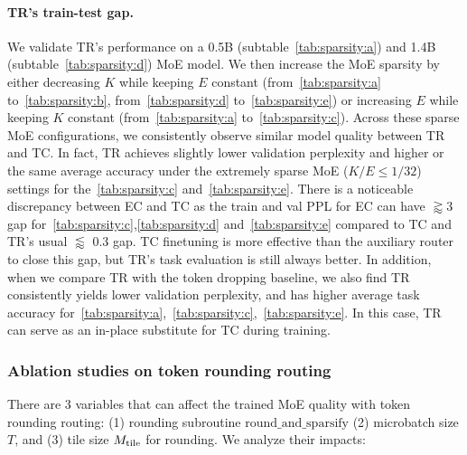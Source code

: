 \paragraph{TR's train-test gap.} We validate TR's performance on a 0.5B (subtable~\ref{tab:sparsity:a}) and 1.4B (subtable~\ref{tab:sparsity:d}) MoE model. We then increase the MoE sparsity by either decreasing $K$ while keeping $E$ constant (from~\ref{tab:sparsity:a} to~\ref{tab:sparsity:b}, from~\ref{tab:sparsity:d} to~\ref{tab:sparsity:e}) or increasing $E$ while keeping $K$ constant (from~\ref{tab:sparsity:a} to~\ref{tab:sparsity:c}). Across these sparse MoE configurations, we consistently observe similar model quality between TR and TC. In fact, TR achieves slightly lower validation perplexity and higher or the same average accuracy under the extremely sparse MoE ($K/E\leq 1/32$) settings for the~\ref{tab:sparsity:c} and~\ref{tab:sparsity:e}. There is a noticeable discrepancy between EC and TC as the train and val PPL for EC can have $\gtrapprox$3 gap for~\ref{tab:sparsity:c},\ref{tab:sparsity:d} and~\ref{tab:sparsity:e} compared to TC and TR's usual $\lessapprox$ 0.3 gap. TC finetuning is more effective than the auxiliary router to close this gap, but TR's task evaluation is still always better. In addition, when we compare TR with the token dropping baseline, we also find TR consistently yields lower validation perplexity, and has higher average task accuracy for~\ref{tab:sparsity:a},~\ref{tab:sparsity:c},~\ref{tab:sparsity:e}. In this case, TR can serve as an in-place substitute for TC during training.




\subsubsection{Ablation studies on token rounding routing} \label{sec:exp:token_rounding_ab}

There are 3 variables that can affect the trained MoE quality with token rounding routing: (1) rounding subroutine $\mathrm{round\_and\_sparsify}$ (2) microbatch size $T$, and (3) tile size $M_\mathrm{tile}$ for rounding. We analyze their impacts:




